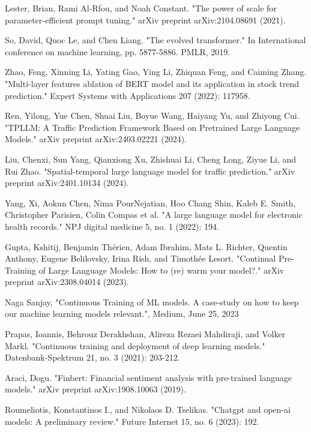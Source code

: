 \documentclass[runningheads]{llncs}
\begin{document}
\begin{thebibliography}{8}
Lester, Brian, Rami Al-Rfou, and Noah Constant. "The power of scale for parameter-efficient prompt tuning." arXiv preprint arXiv:2104.08691 (2021).

So, David, Quoc Le, and Chen Liang. "The evolved transformer." In International conference on machine learning, pp. 5877-5886. PMLR, 2019.

Zhao, Feng, Xinning Li, Yating Gao, Ying Li, Zhiquan Feng, and Caiming Zhang. "Multi-layer features ablation of BERT model and its application in stock trend prediction." Expert Systems with Applications 207 (2022): 117958.

Ren, Yilong, Yue Chen, Shuai Liu, Boyue Wang, Haiyang Yu, and Zhiyong Cui. "TPLLM: A Traffic Prediction Framework Based on Pretrained Large Language Models." arXiv preprint arXiv:2403.02221 (2024).

Liu, Chenxi, Sun Yang, Qianxiong Xu, Zhishuai Li, Cheng Long, Ziyue Li, and Rui Zhao. "Spatial-temporal large language model for traffic prediction." arXiv preprint arXiv:2401.10134 (2024).

Yang, Xi, Aokun Chen, Nima PourNejatian, Hoo Chang Shin, Kaleb E. Smith, Christopher Parisien, Colin Compas et al. "A large language model for electronic health records." NPJ digital medicine 5, no. 1 (2022): 194.

Gupta, Kshitij, Benjamin Thérien, Adam Ibrahim, Mats L. Richter, Quentin Anthony, Eugene Belilovsky, Irina Rish, and Timothée Lesort. "Continual Pre-Training of Large Language Models: How to (re) warm your model?." arXiv preprint arXiv:2308.04014 (2023).

Naga Sanjay, "Continuous Training of ML models. A case-study on how to keep our machine learning models relevant.", Medium, June 25, 2023

Prapas, Ioannis, Behrouz Derakhshan, Alireza Rezaei Mahdiraji, and Volker Markl. "Continuous training and deployment of deep learning models." Datenbank-Spektrum 21, no. 3 (2021): 203-212.

Araci, Dogu. "Finbert: Financial sentiment analysis with pre-trained language models." arXiv preprint arXiv:1908.10063 (2019).

Roumeliotis, Konstantinos I., and Nikolaos D. Tselikas. "Chatgpt and open-ai models: A preliminary review." Future Internet 15, no. 6 (2023): 192.


\end{thebibliography}
\end{document}
